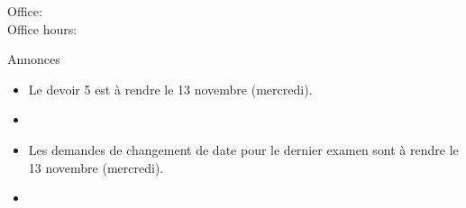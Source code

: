 \documentclass{beamer}
\subtitle[Casse-croûtes et articles]{Les casse-croûtes et les articles}
\begin{document}
  \begin{frame}
    \titlepage
    \tiny{Office: \\
          Office hours: }
  \end{frame}

  \begin{frame}{Annonces }
    \begin{itemize}
      \item Le devoir 5 est à rendre le 13 novembre (mercredi).
      \item[] 
      \item Les demandes de changement de date pour le dernier examen sont à rendre le 13 novembre (mercredi).
      \item[] 
    \end{itemize}
  \end{frame}

\end{document}

